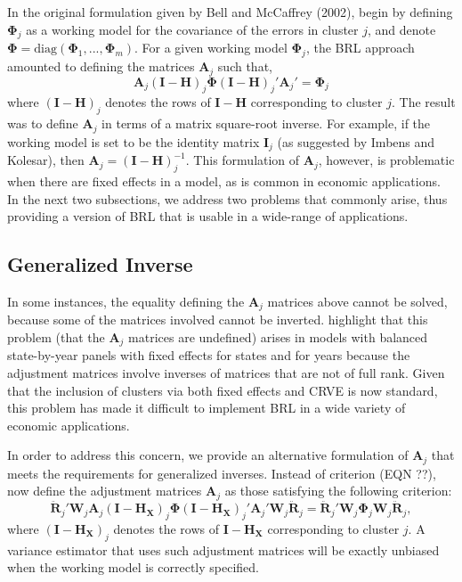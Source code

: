 \documentclass[12pt]{article}
\newcommand{\bm}{\mathbf}
\newcommand{\bs}{\boldsymbol}
\begin{document}
In the original formulation given by Bell and McCaffrey (2002), begin by defining $\bs\Phi_j$ as a working model for the covariance of the errors in cluster $j$, and denote $\bs\Phi = \text{diag}\left(\bs\Phi_1,...,\bs\Phi_m\right)$.
For a given working model $\bs\Phi_j$, the BRL approach amounted to defining the matrices $\bm{A}_j$ such that,
\begin{equation}
\label{eq:CR2_criterion_BMv}
\bm{A}_j \left(\bm{I} - \bm{H}\right)_j \bs\Phi \left(\bm{I} - \bm{H}\right)_j' \bm{A}_j'  =  \bs\Phi_j 
\end{equation}
where $\left(\bm{I} - \bm{H}\right)_j$ denotes the rows of $\bm{I} - \bm{H}$ corresponding to cluster $j$.
The result was to define $\bm{A}_j$ in terms of a matrix square-root inverse. 
For example, if the working model is set to be the identity matrix $\bm{I}_j$ (as suggested by Imbens and Kolesar), then $\bm{A}_j = \bm{(I - H)}_j^{-1}$. 
This formulation of $\bm{A}_j$, however, is problematic when there are fixed effects in a model, as is common in economic applications. 
In the next two subsections, we address two problems that commonly arise, thus providing a version of BRL that is usable in a wide-range of applications.

\subsection{Generalized Inverse}

In some instances, the equality defining the $\bm{A}_j$ matrices above cannot be solved, because some of the matrices involved cannot be inverted. 
\citet{Angrist2009mostly} highlight that this problem (that the $\bm{A}_j$ matrices are undefined) arises in models with balanced state-by-year panels with fixed effects for states and for years because the adjustment matrices involve inverses of matrices that are not of full rank. Given that the inclusion of clusters via both fixed effects and CRVE is now standard, this problem has made it difficult to implement BRL in a wide variety of economic applications. 

In order to address this concern, we provide an alternative formulation of $\bm{A}_j$ that meets the requirements for generalized inverses. 
Instead of criterion (EQN ??), now define the adjustment matrices $\bm{A}_j$ as those satisfying the following criterion:
\begin{equation}
\label{eq:CR2_criterion}
\bm{\ddot{R}}_j' \bm{W}_j \bm{A}_j \left(\bm{I} - \bm{H_X}\right)_j \bs\Phi \left(\bm{I} - \bm{H_X}\right)_j' \bm{A}_j' \bm{W}_j \bm{\ddot{R}}_j = \bm{\ddot{R}}_j' \bm{W}_j \bs\Phi_j \bm{W}_j \bm{\ddot{R}}_j,
\end{equation}
where $\left(\bm{I} - \bm{H_X}\right)_j$ denotes the rows of $\bm{I} - \bm{H_X}$ corresponding to cluster $j$. 
A variance estimator that uses such adjustment matrices will be exactly unbiased when the working model is correctly specified.
\end{document}
